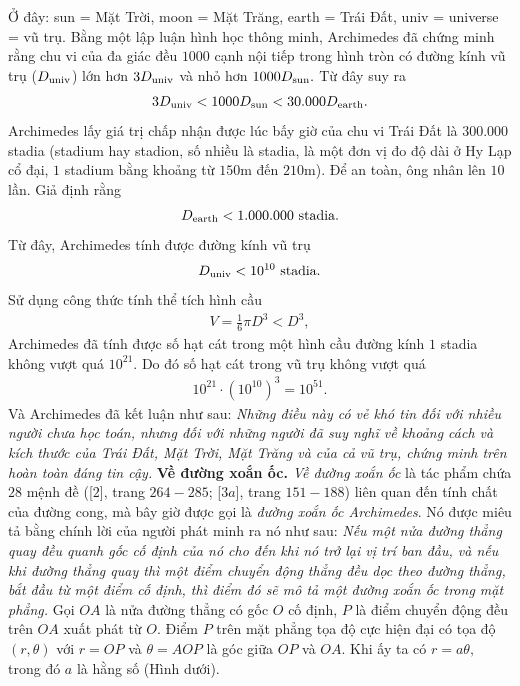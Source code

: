 \begin{multicols}{2}
	Ở đây: sun = Mặt Trời, moon = Mặt Trăng, earth = Trái Đất, univ = universe = vũ trụ.
	\vskip 0.1cm
	Bằng một lập luận hình học thông minh, Archimedes đã chứng minh rằng chu vi của đa giác đều $1000$ cạnh nội tiếp trong hình tròn có đường kính vũ trụ (${D_{{\rm{univ}}}}$) lớn hơn  $3{D_{{\rm{univ}}}}$ và nhỏ hơn $1000{D_{{\rm{sun}}}}{\rm{.}}$  Từ đây suy ra
	\begin{align*}
		3{D_{{\rm{univ}}}} < 1000{D_{{\rm{sun}}}} < 30.000{D_{{\rm{earth}}}}.
	\end{align*}
	Archimedes lấy giá trị chấp nhận được lúc bấy giờ của chu vi Trái Đất là $300.000$ stadia (stadium hay stadion, số nhiều là stadia, là một đơn vị đo độ dài ở Hy Lạp cổ đại, $1$ stadium bằng khoảng từ $150$m đến $210$m). Để an toàn, ông nhân lên $10$ lần. Giả định rằng
	\begin{align*}
		{D_{{\rm{earth}}}} < 1.000.000 \text{ stadia.}
	\end{align*}
	Từ đây, Archimedes tính được đường kính vũ trụ 
	\begin{align*}
		{D_{{\rm{univ}}}} < {10^{10}} \text{ stadia.}
	\end{align*}
	Sử dụng công thức tính thể tích hình cầu 
	\begin{align*}
		V = \frac{1}{6}\pi {D^3} < {D^3},
	\end{align*}
	Archimedes đã tính được số hạt cát trong một hình cầu đường kính $1$ stadia không vượt quá $10^{21}$. Do đó số hạt cát trong vũ trụ không vượt quá 
	\begin{align*}
		{10^{21}} \cdot {\left( {{{10}^{10}}} \right)^3} = {10^{51}}.
	\end{align*}
	Và Archimedes đã kết luận như sau: \textit{Những điều này có vẻ khó tin đối với nhiều người chưa học toán, nhưng đối với những người đã suy nghĩ về khoảng cách và kích thước của Trái Đất, Mặt Trời, Mặt Trăng và của cả vũ trụ, chứng minh trên hoàn toàn đáng tin cậy.}
	\vskip 0.1cm
	\textbf{\color{lichsutoanhoc}Về đường xoắn ốc.} \textit{Về đường xoắn ốc} là tác phẩm chứa $28$ mệnh đề ([$2$], trang $264-285$; [$3a$], trang $151-188$) liên quan đến tính chất của đường cong, mà bây giờ được gọi là \textit{đường xoắn ốc Archimedes}. Nó được miêu tả bằng chính lời của người phát minh ra nó như sau: \textit{Nếu một nửa đường thẳng quay đều quanh gốc cố định của nó cho đến khi nó trở lại vị trí ban đầu, và nếu khi đường thẳng quay thì một điểm chuyển động thẳng đều dọc theo đường thẳng, bắt đầu từ một điểm cố định, thì điểm đó sẽ mô tả một đường xoắn ốc trong mặt phẳng.  }
	\vskip 0.1cm
	Gọi $OA$ là nửa đường thẳng có gốc $O$  cố định, $P$  là điểm chuyển động đều trên $OA$ xuất phát từ $O$.  Điểm $P$  trên mặt phẳng tọa độ cực hiện đại có tọa độ $\left( {r,\theta } \right)$  với $r = OP$  và  $\theta  = AOP$ là góc giữa $OP$  và $OA$.  Khi ấy ta có $r = a\theta ,$  trong đó  $a$ là hằng số (Hình dưới).  

\end{multicols}
